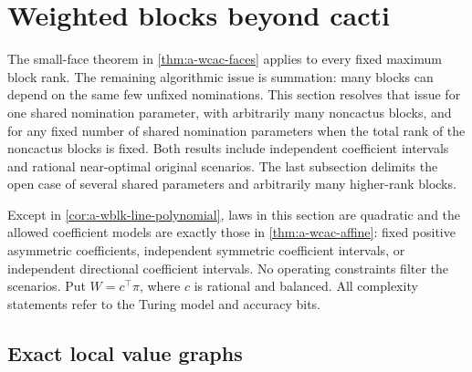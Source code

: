 \section{Weighted blocks beyond cacti}
\label{sec:a-weighted-blocks}

The small-face theorem in \cref{thm:a-wcac-faces} applies to every fixed
maximum block rank. The remaining algorithmic issue is summation: many
blocks can depend on the same few unfixed nominations. This section
resolves that issue for one shared nomination parameter, with
arbitrarily many noncactus blocks, and for any fixed number of shared
nomination parameters when the total rank of the noncactus blocks is
fixed. Both results include independent coefficient intervals and
rational near-optimal original scenarios. The last subsection delimits
the open case of several shared parameters and arbitrarily many
higher-rank blocks.

Except in \cref{cor:a-wblk-line-polynomial}, laws in this section are
quadratic and the allowed coefficient models are exactly those in
\cref{thm:a-wcac-affine}: fixed positive
asymmetric coefficients, independent symmetric coefficient intervals, or
independent directional coefficient intervals. No operating constraints
filter the scenarios. Put $W=c^\top\pi$, where $c$ is rational and balanced.
All complexity statements refer to the Turing model and accuracy bits.

\subsection{Exact local value graphs}

